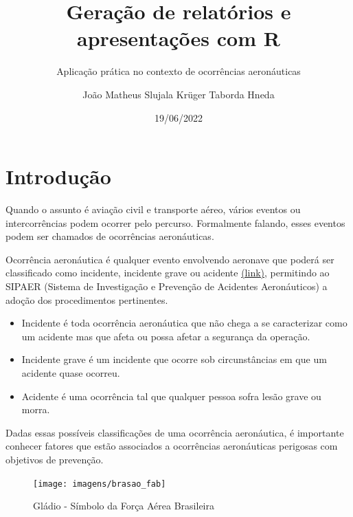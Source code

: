 \documentclass[
]{article}
\title{Geração de relatórios e apresentações com R}
\subtitle{Aplicação prática no contexto de ocorrências aeronáuticas}
\author{João Matheus Slujala Krüger Taborda Hneda}
\date{19/06/2022}
\providecommand{\tightlist}{%
  \setlength{\itemsep}{0pt}\setlength{\parskip}{0pt}}
\begin{document}
\maketitle

\renewcommand*\contentsname{Sumário}
{
\setcounter{tocdepth}{5}
\tableofcontents
}
\newpage

\hypertarget{introduuxe7uxe3o}{%
\section{Introdução}\label{introduuxe7uxe3o}}

Quando o assunto é aviação civil e transporte aéreo, vários eventos ou
intercorrências podem ocorrer pelo percurso. Formalmente falando, esses
eventos podem ser chamados de ocorrências aeronáuticas.

Ocorrência aeronáutica é qualquer evento envolvendo aeronave que poderá
ser classificado como incidente, incidente grave ou acidente
\href{https://www3.fmb.unesp.br/sete/pluginfile.php/20354/mod_page/content/2/A_Investigacao_de_acidentes_aeronauticos_Conforme_a_Lei_no_7.pdf}{(link)},
permitindo ao SIPAER (Sistema de Investigação e Prevenção de Acidentes
Aeronáuticos) a adoção dos procedimentos pertinentes.

\begin{itemize}
\tightlist
\item
  Incidente é toda ocorrência aeronáutica que não chega a se
  caracterizar como um acidente mas que afeta ou possa afetar a
  segurança da operação.
\item
  Incidente grave é um incidente que ocorre sob circunstâncias em que um
  acidente quase ocorreu.
\item
  Acidente é uma ocorrência tal que qualquer pessoa sofra lesão grave ou
  morra.
\end{itemize}

Dadas essas possíveis classificações de uma ocorrência aeronáutica, é
importante conhecer fatores que estão associados a ocorrências
aeronáuticas perigosas com objetivos de prevenção.

\begin{figure}

{\centering \texttt{[image: imagens/brasao\_fab]} 

}

\caption{Gládio - Símbolo  da Força Aérea Brasileira}\label{fig:unnamed-chunk-1}
\end{figure}

\newpage
\end{document}
